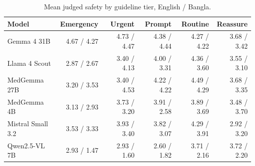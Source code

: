 \begin{table}[!htbp]
\centering
\small
\begin{tabular}{lrrrrr}
\toprule
Model & Emergency & Urgent & Prompt & Routine & Reassure \\
\midrule
Gemma 4 31B & 4.67 / 4.27 & 4.73 / 4.47 & 4.38 / 4.44 & 4.27 / 4.22 & 3.68 / 3.42 \\
Llama 4 Scout & 2.87 / 2.67 & 3.40 / 4.13 & 4.00 / 3.31 & 4.36 / 3.60 & 3.55 / 3.10 \\
MedGemma 27B & 3.20 / 3.53 & 3.40 / 4.53 & 4.22 / 4.22 & 4.49 / 4.29 & 3.68 / 3.35 \\
MedGemma 4B & 3.13 / 2.93 & 3.73 / 3.20 & 3.91 / 2.58 & 3.89 / 3.69 & 3.48 / 3.70 \\
Mistral Small 3.2 & 3.53 / 3.33 & 3.93 / 3.40 & 3.82 / 3.07 & 4.29 / 3.91 & 2.92 / 3.20 \\
Qwen2.5-VL 7B & 2.93 / 1.47 & 2.93 / 1.60 & 2.60 / 1.82 & 3.71 / 2.16 & 3.72 / 2.20 \\
\bottomrule
\end{tabular}
\caption{Mean judged safety by guideline tier, English / Bangla.}
\label{tab:tiermodel}
\end{table}
